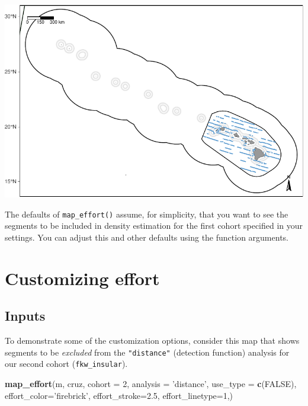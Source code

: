 \documentclass[
]{book}
\newenvironment{Shaded}{\begin{snugshade}}{\end{snugshade}}
\newcommand{\DataTypeTok}[1]{\textcolor[rgb]{0.13,0.29,0.53}{#1}}
\newcommand{\DecValTok}[1]{\textcolor[rgb]{0.00,0.00,0.81}{#1}}
\newcommand{\FloatTok}[1]{\textcolor[rgb]{0.00,0.00,0.81}{#1}}
\newcommand{\KeywordTok}[1]{\textcolor[rgb]{0.13,0.29,0.53}{\textbf{#1}}}
\newcommand{\NormalTok}[1]{#1}
\newcommand{\OtherTok}[1]{\textcolor[rgb]{0.56,0.35,0.01}{#1}}
\newcommand{\StringTok}[1]{\textcolor[rgb]{0.31,0.60,0.02}{#1}}
\begin{document}
\includegraphics{figures/unnamed-chunk-47-1.pdf}

The defaults of \texttt{map\_effort()} assume, for simplicity, that you want to see the segments to be included in density estimation for the first cohort specified in your settings. You can adjust this and other defaults using the function arguments.

\hypertarget{customizing-effort}{%
\section*{Customizing effort}\label{customizing-effort}}

\hypertarget{inputs}{%
\subsection*{Inputs}\label{inputs}}

To demonstrate some of the customization options, consider this map that shows segments to be \emph{excluded} from the \texttt{"distance"} (detection function) analysis for our second cohort (\texttt{fkw\_insular}).

\begin{Shaded}
\begin{Highlighting}[]
\KeywordTok{map_effort}\NormalTok{(m, cruz,}
           \DataTypeTok{cohort =} \DecValTok{2}\NormalTok{,}
           \DataTypeTok{analysis =} \StringTok{'distance'}\NormalTok{,}
           \DataTypeTok{use_type =} \KeywordTok{c}\NormalTok{(}\OtherTok{FALSE}\NormalTok{),}
           \DataTypeTok{effort_color=}\StringTok{'firebrick'}\NormalTok{,}
           \DataTypeTok{effort_stroke=}\FloatTok{2.5}\NormalTok{,}
           \DataTypeTok{effort_linetype=}\DecValTok{1}\NormalTok{,)}
\end{Highlighting}
\end{Shaded}
\end{document}
